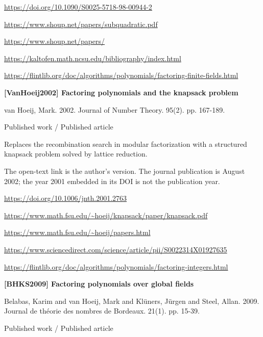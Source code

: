 \documentclass[11pt,a4paper,oneside,openany]{book}
\begin{document}
{\footnotesize\url{https://doi.org/10.1090/S0025-5718-98-00944-2}}\par
{\footnotesize\url{https://www.shoup.net/papers/subquadratic.pdf}}\par
{\footnotesize\url{https://www.shoup.net/papers/}}\par
{\footnotesize\url{https://kaltofen.math.ncsu.edu/bibliography/index.html}}\par
{\footnotesize\url{https://flintlib.org/doc/algorithms/polynomials/factoring-finite-fields.html}}\par
\vspace{9pt}
\hypertarget{ref:VanHoeij2002}{}
{\sffamily\bfseries\color{atlasgreen}[VanHoeij2002] Factoring polynomials and the knapsack problem}\par
\color{black} van Hoeij, Mark. 2002. Journal of Number Theory. 95(2). pp. 167-189.\par
{\small\sffamily\color{atlasgold}Published work / Published article}\par
\color{black} Replaces the recombination search in modular factorization with a structured knapsack problem solved by lattice reduction.\par
{\small The open-text link is the author's version. The journal publication is August 2002; the year 2001 embedded in its DOI is not the publication year.}\par
{\footnotesize\url{https://doi.org/10.1006/jnth.2001.2763}}\par
{\footnotesize\url{https://www.math.fsu.edu/~hoeij/knapsack/paper/knapsack.pdf}}\par
{\footnotesize\url{https://www.math.fsu.edu/~hoeij/papers.html}}\par
{\footnotesize\url{https://www.sciencedirect.com/science/article/pii/S0022314X01927635}}\par
{\footnotesize\url{https://flintlib.org/doc/algorithms/polynomials/factoring-integers.html}}\par
\vspace{9pt}
\hypertarget{ref:BHKS2009}{}
{\sffamily\bfseries\color{atlasgreen}[BHKS2009] Factoring polynomials over global fields}\par
\color{black} Belabas, Karim and van Hoeij, Mark and Klüners, Jürgen and Steel, Allan. 2009. Journal de théorie des nombres de Bordeaux. 21(1). pp. 15-39.\par
{\small\sffamily\color{atlasgold}Published work / Published article}\par
\end{document}

